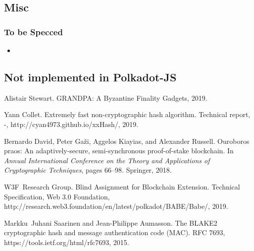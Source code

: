 \documentclass{article}
\newcommand{\tmtextit}[1]{{\itshape{#1}}}
\newcommand{\tmtexttt}[1]{{\ttfamily{#1}}}
\newcommand{\tmverbatim}[1]{{\ttfamily{#1}}}
\newenvironment{itemizedot}{\begin{itemize} \renewcommand{\labelitemi}{$\bullet$}\renewcommand{\labelitemii}{$\bullet$}\renewcommand{\labelitemiii}{$\bullet$}\renewcommand{\labelitemiv}{$\bullet$}}{\end{itemize}}
\providecommand{\tmtextit}[1]{\tmtextit{#1}}
\providecommand{\tmverbatim}[1]{\tmtexttt{#1}}
\begin{document}
\subsection{Misc}

\subsubsection{To be Specced}
\begin{itemizedot}
  \item \tmverbatim{ext\_chain\_id}
\end{itemizedot}
\tmverbatim{}\subsection{Not implemented in Polkadot-JS}

\begin{thebibliography}{DGKR18}
  Alistair Stewart.
  {\newblock}GRANDPA: A Byzantine Finality Gadgets, 2019.
  
  Yann Collet. {\newblock}Extremely fast
  non-cryptographic hash algorithm. {\newblock}Technical report, -,
  http://cyan4973.github.io/xxHash/, 2019.
  
  Bernardo David, Peter Ga{\v z}i,
  Aggelos Kiayias, and Alexander Russell. {\newblock}Ouroboros praos: An
  adaptively-secure, semi-synchronous proof-of-stake blockchain. {\newblock}In
  \tmtextit{Annual International Conference on the Theory and Applications of
  Cryptographic Techniques}, pages 66--98. Springer, 2018.
  
  W3F~Research Group.
  {\newblock}Blind Assignment for Blockchain Extension. {\newblock}Technical
  Specification, Web 3.0 Foundation,
  http://research.web3.foundation/en/latest/polkadot/BABE/Babe/, 2019.
  
  Markku~Juhani Saarinen and Jean-Philippe
  Aumasson. {\newblock}The BLAKE2 cryptographic hash and message
  authentication code (MAC). {\newblock}RFC 7693,
  https://tools.ietf.org/html/rfc7693, 2015.
\end{thebibliography}
\end{document}
